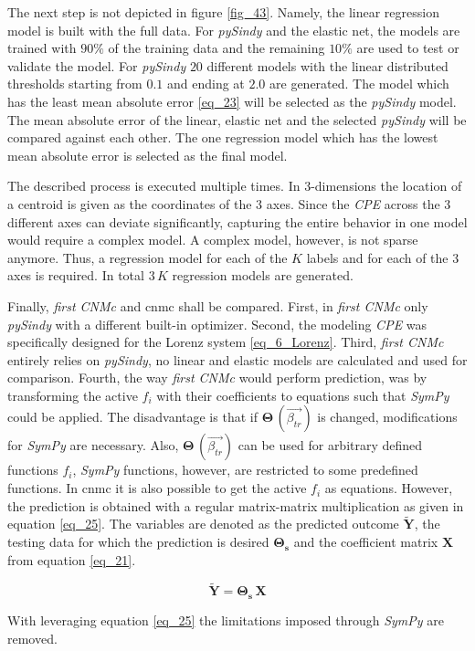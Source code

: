 The next step is not depicted in figure \ref{fig_43}. 
Namely, the linear regression model is built with the full data. For \emph{pySindy} and the elastic net, the models are trained with $90 \%$ of the training data and the remaining $10 \%$ are used to test or validate the model.
For \emph{pySindy} $20$ different models with the linear distributed thresholds starting from $0.1$ and ending at $2.0$ are generated. 
The model which has the least mean absolute error \eqref{eq_23} will be selected as the \emph{pySindy} model.
The mean absolute error of the linear, elastic net and the selected \emph{pySindy} will be compared against each other. 
The one regression model which has the lowest mean absolute error is selected as the final model.\newline

The described process is executed multiple times. 
In 3-dimensions the location of a centroid is given as the coordinates of the 3 axes. 
Since the \emph{CPE} across the 3 different axes can deviate significantly, capturing the entire behavior in one model would require a complex model. 
A complex model, however, is not sparse anymore. 
Thus, a regression model for each of the $K$ labels and for each of the 3 axes is required. 
In total $3 \, K$ regression models are generated. \newline

Finally, \emph{first CNMc} and \gls{cnmc} shall be compared.
First, in \emph{first CNMc} only \emph{pySindy} with a different built-in optimizer. 
Second, the modeling \emph{CPE} was specifically designed for the Lorenz system \eqref{eq_6_Lorenz}. 
Third, \emph{first CNMc} entirely relies on \emph{pySindy}, no linear and elastic models are calculated and used for comparison. 
Fourth, the way \emph{first CNMc} would perform prediction, was by transforming the active $f_i$ with their coefficients to equations such that \emph{SymPy} could be applied. 
The disadvantage is that if $\boldsymbol{\Theta}\,(\vec{\beta_{tr}})$ is changed, modifications for \emph{SymPy} are necessary.
Also, $\boldsymbol{\Theta}\,(\vec{\beta_{tr}})$ can be used for arbitrary defined functions $f_i$, \emph{SymPy} functions, however, are restricted to some predefined functions.
In \gls{cnmc} it is also possible to get the active $f_i$ as equations. 
However, the prediction is obtained with a regular matrix-matrix multiplication as given in equation \eqref{eq_25}. The variables are denoted as the predicted outcome $\bm{\tilde{Y}}$, the testing data for which the prediction is desired $\bm{\Theta_s}$ and the coefficient matrix $\bm X$ from equation \eqref{eq_21}.

\begin{equation}
    \bm{\tilde{Y}} = \bm{\Theta_s} \, \bm X 
    \label{eq_25}
\end{equation}


With leveraging equation \eqref{eq_25} the limitations imposed through \emph{SymPy} are removed.
